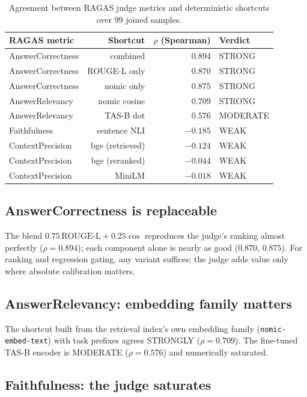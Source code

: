 \documentclass[11pt]{article}
\begin{document}
\begin{table}[ht]
  \centering
  \caption{Agreement between RAGAS judge metrics and deterministic shortcuts
  over 99 joined samples.}
  \label{tab:correlations}
  \begin{tabular}{lrrl}
    \toprule
    RAGAS metric & Shortcut & $\rho$ (Spearman) & Verdict \\
    \midrule
    AnswerCorrectness & combined & $0.894$ & STRONG \\
    AnswerCorrectness & ROUGE-L only & $0.870$ & STRONG \\
    AnswerCorrectness & nomic only & $0.875$ & STRONG \\
    AnswerRelevancy & nomic cosine & $0.709$ & STRONG \\
    AnswerRelevancy & TAS-B dot & $0.576$ & MODERATE \\
    Faithfulness & sentence NLI & $-0.185$ & WEAK \\
    ContextPrecision & bge (retrieved) & $-0.124$ & WEAK \\
    ContextPrecision & bge (reranked) & $-0.044$ & WEAK \\
    ContextPrecision & MiniLM & $-0.018$ & WEAK \\
    \bottomrule
  \end{tabular}
\end{table}

\subsection{AnswerCorrectness is replaceable}\label{sec:ac}

The blend $0.75\,\mathrm{ROUGE\text{-}L} + 0.25\cos$ reproduces the judge's
ranking almost perfectly ($\rho=0.894$); each component alone is nearly as
good ($0.870$, $0.875$). For ranking and regression gating, any variant
suffices; the judge adds value only where absolute calibration matters.

\subsection{AnswerRelevancy: embedding family matters}\label{sec:ar}

The shortcut built from the retrieval index's own embedding family
(\texttt{nomic-embed-text}) with task prefixes agrees STRONGLY
($\rho=0.709$). The fine-tuned TAS-B encoder is MODERATE ($\rho=0.576$) and
numerically saturated.

\subsection{Faithfulness: the judge saturates}\label{sec:ff}
\end{document}
